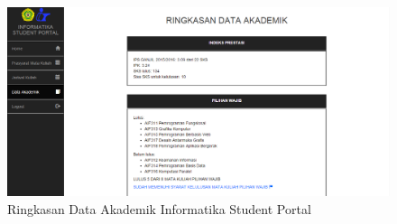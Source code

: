 		\begin{figure}[H]
			\centering
			\includegraphics[scale=0.35]{Gambar/ringkasan_if_eksperimen}
			\caption{Ringkasan Data Akademik Informatika Student Portal} 
			\label{fig:5_ringkasan_IF}
		\end{figure}
		
